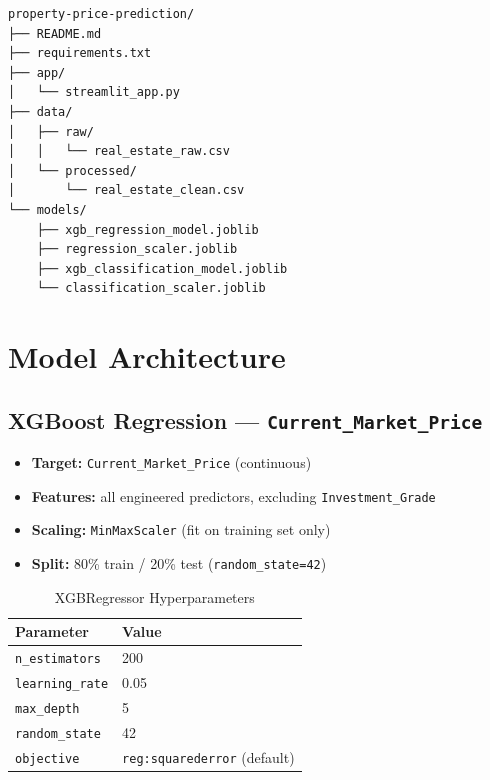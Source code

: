 \documentclass[12pt,a4paper]{article}
\begin{document}
\begin{lstlisting}[caption={Project Directory Layout}]
property-price-prediction/
├── README.md
├── requirements.txt
├── app/
│   └── streamlit_app.py
├── data/
│   ├── raw/
│   │   └── real_estate_raw.csv
│   └── processed/
│       └── real_estate_clean.csv
└── models/
    ├── xgb_regression_model.joblib
    ├── regression_scaler.joblib
    ├── xgb_classification_model.joblib
    └── classification_scaler.joblib
\end{lstlisting}

\section{Model Architecture}

\subsection{XGBoost Regression --- \texttt{Current\_Market\_Price}}

\begin{itemize}[noitemsep]
    \item \textbf{Target:} \texttt{Current\_Market\_Price} (continuous)
    \item \textbf{Features:} all engineered predictors, excluding \texttt{Investment\_Grade}
    \item \textbf{Scaling:} \texttt{MinMaxScaler} (fit on training set only)
    \item \textbf{Split:} 80\% train / 20\% test (\texttt{random\_state=42})
\end{itemize}

\begin{table}[H]
\centering
\caption{XGBRegressor Hyperparameters}
\begin{tabular}{@{} l l @{}}
\toprule
\textbf{Parameter} & \textbf{Value} \\
\midrule
\texttt{n\_estimators}  & 200  \\
\texttt{learning\_rate} & 0.05 \\
\texttt{max\_depth}     & 5    \\
\texttt{random\_state}  & 42   \\
\texttt{objective}      & \texttt{reg:squarederror} (default) \\
\bottomrule
\end{tabular}
\end{table}
\end{document}
